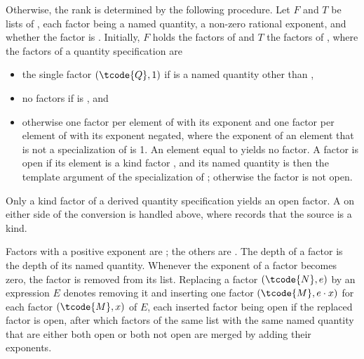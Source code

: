 \pnum
Otherwise, the rank is determined by the following procedure.
Let $F$ and $T$ be lists of ,
each factor being a named quantity, a non-zero rational exponent, and
whether the factor is .
Initially, $F$ holds the factors of  and $T$ the factors of ,
where the factors of a quantity specification  are
\begin{itemize}
\item
the single factor $(\tcode{Q}, 1)$ if  is a named quantity other than ,
\item
no factors if  is , and
\item
otherwise one factor per element of  with its exponent and
one factor per element of  with its exponent negated,
where the exponent of an element that is not a specialization of  is 1.
An element equal to  yields no factor.
A factor is open if its element is a kind factor ,
and its named quantity is then the template argument of the specialization of ;
otherwise the factor is not open.
\end{itemize}
\begin{note}
Only a kind factor of a derived quantity specification yields an open factor.
A  on either side of the conversion is handled above,
where  records that the source is a kind.
\end{note}
Factors with a positive exponent are ;
the others are .
The depth of a factor is the depth of its named quantity.
Whenever the exponent of a factor becomes zero, the factor is removed from its list.
Replacing a factor $(\tcode{N}, e)$ by an expression $E$ denotes
removing it and inserting one factor $(\tcode{M}, e \cdot x)$ for each factor $(\tcode{M}, x)$ of
$E$, each inserted factor being open if the replaced factor is open,
after which factors of the same list with the same named quantity
that are either both open or both not open are merged by adding their exponents.

